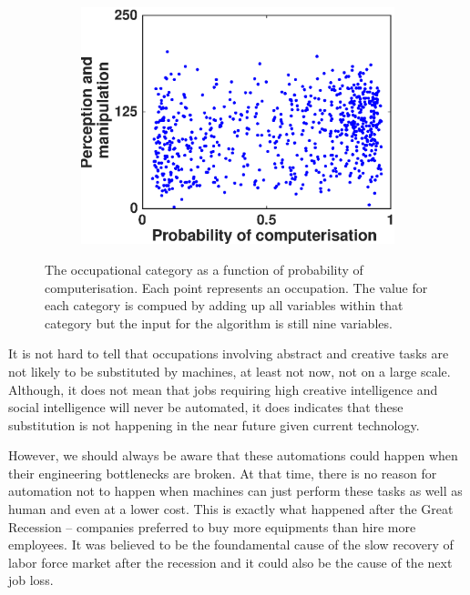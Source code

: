 \documentclass[11pt]{report}
\numberwithin{equation}{chapter}
\begin{document}
\begin{spacing}{2}
\begin{figure}[!htb]
\begin{subfigure}{0.55\textwidth}
\centering
	\includegraphics[scale = 0.5]{perception_and_manipulation.eps}
\end{subfigure}


\caption{The occupational category as a function of probability of computerisation. Each point represents an occupation. The value for each category is compued by adding up all variables within that category but the input for the algorithm is still nine variables.}
\label{fig:category2010}
\end{figure}

It is not hard to tell that occupations involving abstract and creative tasks are not likely to be substituted by machines, at least not now, not on a large scale. Although, it does not mean that jobs requiring high creative intelligence and social intelligence will never be automated, it does indicates that these substitution is not happening in the near future given current technology. 

However, we should always be aware that these automations could happen when their engineering bottlenecks are broken. At that time, there is no reason for automation not to happen when machines can just perform these tasks as well as human and even at a lower cost. This is exactly what happened after the Great Recession -- companies preferred to buy more equipments than hire more employees. It was believed to be the foundamental cause of the slow recovery of labor force market after the recession\cite{brynjolfsson2012race} and it could also be the cause of the next job loss.









\end{spacing}
\end{document}
